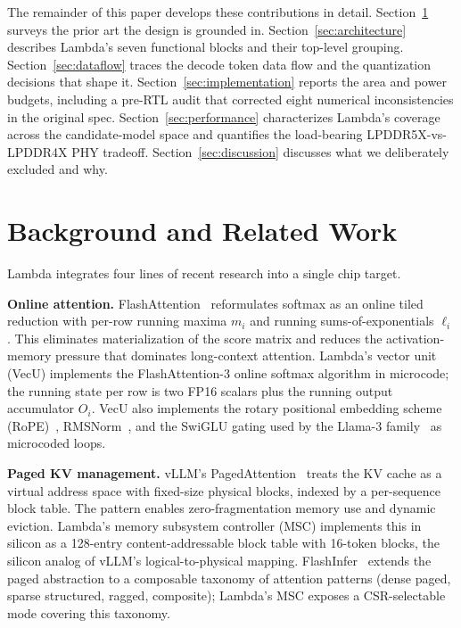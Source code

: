 \documentclass[conference]{IEEEtran}
\begin{document}
The remainder of this paper develops these contributions in detail. Section~\ref{sec:background} surveys the prior art the design is grounded in. Section~\ref{sec:architecture} describes Lambda's seven functional blocks and their top-level grouping. Section~\ref{sec:dataflow} traces the decode token data flow and the quantization decisions that shape it. Section~\ref{sec:implementation} reports the area and power budgets, including a pre-RTL audit that corrected eight numerical inconsistencies in the original spec. Section~\ref{sec:performance} characterizes Lambda's coverage across the candidate-model space and quantifies the load-bearing LPDDR5X-vs-LPDDR4X PHY tradeoff. Section~\ref{sec:discussion} discusses what we deliberately excluded and why.

\section{Background and Related Work}
\label{sec:background}

Lambda integrates four lines of recent research into a single chip target.

\textbf{Online attention.} FlashAttention~\cite{flashattention,flashattention2,flashattention3} reformulates softmax as an online tiled reduction with per-row running maxima $m_i$ and running sums-of-exponentials $\ell_i$. This eliminates materialization of the score matrix and reduces the activation-memory pressure that dominates long-context attention. Lambda's vector unit (VecU) implements the FlashAttention-3 online softmax algorithm in microcode; the running state per row is two FP16 scalars plus the running output accumulator $O_i$. VecU also implements the rotary positional embedding scheme (RoPE)~\cite{rope}, RMSNorm~\cite{rmsnorm}, and the SwiGLU gating used by the Llama-3 family~\cite{swiglu} as microcoded loops.

\textbf{Paged KV management.} vLLM's PagedAttention~\cite{pagedattention} treats the KV cache as a virtual address space with fixed-size physical blocks, indexed by a per-sequence block table. The pattern enables zero-fragmentation memory use and dynamic eviction. Lambda's memory subsystem controller (MSC) implements this in silicon as a 128-entry content-addressable block table with 16-token blocks, the silicon analog of vLLM's logical-to-physical mapping. FlashInfer~\cite{flashinfer} extends the paged abstraction to a composable taxonomy of attention patterns (dense paged, sparse structured, ragged, composite); Lambda's MSC exposes a CSR-selectable mode covering this taxonomy.
\end{document}
